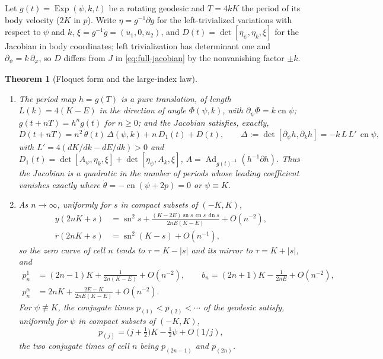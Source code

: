 \documentclass[11pt]{article}
\newtheorem{theorem}{Theorem}[section]
\theoremstyle{remark}
\newcommand{\sn}{\operatorname{sn}}
\newcommand{\cn}{\operatorname{cn}}
\newcommand{\dn}{\operatorname{dn}}
\begin{document}
Let $g(t)=\operatorname{Exp}(\psi,k,t)$ be a rotating geodesic and
$T=4kK$ the period of its body velocity ($2K$ in $p$).  Write
$\eta=g^{-1}\partial g$ for the left-trivialized variations with respect to
$\psi$ and $k$, $\xi=g^{-1}\dot g=(u_1,0,u_2)$, and
$D(t)=\det[\eta_\psi,\eta_k,\xi]$ for the Jacobian in body coordinates;
left trivialization has determinant one and $\partial_\psi=k\,\partial_\varphi$,
so $D$ differs from $J$ in \eqref{eq:full-jacobian} by the nonvanishing
factor $\pm k$.

\begin{theorem}[Floquet form and the large-index law]\label{thm:floquet}
\begin{enumerate}[label=(\roman*),nosep,leftmargin=*]
\item The period map $h=g(T)$ is a pure translation, of length
 $L(k)=4(K-E)$ in the direction of angle $\Phi(\psi,k)$, with
 $\partial_\psi\Phi=k\cn\psi$; $g(t+nT)=h^ng(t)$ for $n\ge0$; and the
 Jacobian satisfies, exactly,
 \begin{equation}\label{eq:floquet}
  D(t+nT)=n^2\,\dot\theta(t)\,\Delta(\psi,k)+n\,D_1(t)+D(t),\qquad
  \Delta:=\det[\partial_\psi h,\partial_kh]=-k\,L\,L'\,\cn\psi,
 \end{equation}
 with $L'=4(dK/dk-dE/dk)>0$ and
 $D_1(t)=\det[A_\psi,\eta_k,\xi]+\det[\eta_\psi,A_k,\xi]$,
 $A=\operatorname{Ad}_{g(t)^{-1}}(h^{-1}\partial h)$.  Thus the Jacobian is a
 quadratic in the number of periods whose leading coefficient vanishes
 exactly where $\dot\theta=-\cn(\psi+2p)=0$ or $\psi\equiv K$.
\item As $n\to\infty$, uniformly for $s$ in compact
 subsets of $(-K,K)$,
 \begin{equation}\label{eq:y-limit}
 \begin{aligned}
  y(2nK+s)&=\sn^2s+\frac{(K-2E)\sn s\,\cn s\,\dn s}{2nE(K-E)}+O(n^{-2}),\\
  r(2nK+s)&=\sn^2(K-s)+O(n^{-1}),
 \end{aligned}
 \end{equation}
 so the zero curve of cell $n$ tends to $\tau=K-|s|$ and its mirror to
 $\tau=K+|s|$, and
 \begin{equation}\label{eq:endpoints-n}
 \begin{aligned}
  p_n^1&=(2n-1)K+\frac{1}{2n(K-E)}+O(n^{-2}),\qquad
  b_n=(2n+1)K-\frac{1}{2nE}+O(n^{-2}),\\
  p_n^\alpha&=2nK+\frac{2E-K}{2nE(K-E)}+O(n^{-2}).
 \end{aligned}
 \end{equation}
 For $\psi\not\equiv K$, the conjugate times $p_{(1)}<p_{(2)}<\cdots$ of
 the geodesic satisfy, uniformly for $\psi$ in compact subsets of $(-K,K)$,
 \begin{equation}\label{eq:law}
  p_{(j)}=\bigl(j+\tfrac12\bigr)K-\tfrac12\psi+O(1/j),
 \end{equation}
 the two conjugate times of cell $n$ being $p_{(2n-1)}$ and $p_{(2n)}$.
\end{enumerate}
\end{theorem}
\end{document}
